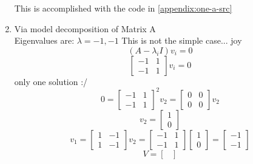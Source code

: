 \begin{enumerate}
    This is accomplished with the code in \autoref{appendix:one-a-src}
  \item Via model decomposition of Matrix A \\
    Eigenvalues are: $\lambda = -1, -1$
    This is not the simple case... joy
    \begin{equation}
      (A -\lambda_iI)v_i = 0
    \end{equation}
    \begin{equation}
      \begin{bmatrix}
        -1 & 1 \\
        -1 & 1
      \end{bmatrix}v_i = 0
    \end{equation}
    only one solution :/    
    \begin{equation}
      0 = 
      \begin{bmatrix}
        -1 & 1 \\
        -1 & 1
      \end{bmatrix}^2v_2 =
      \begin{bmatrix}
        0 & 0 \\
        0 & 0
      \end{bmatrix}v_2
    \end{equation}
    \begin{equation}
      v_2 =
      \begin{bmatrix}
        1 \\
        0
      \end{bmatrix}
    \end{equation}
    \begin{equation}
      v_1 =
      \begin{bmatrix}
        1 & -1 \\
        1 &  -1
      \end{bmatrix}v_2 = 
      \begin{bmatrix}
        -1 & 1 \\
        -1 & 1
      \end{bmatrix}
      \begin{bmatrix}
        1 \\
        0
      \end{bmatrix} = 
      \begin{bmatrix}
        -1 \\
        -1
      \end{bmatrix}
    \end{equation}
    \begin{equation}
      V =
      \begin{bmatrix}

\end{bmatrix}
\end{equation}
\end{enumerate}

